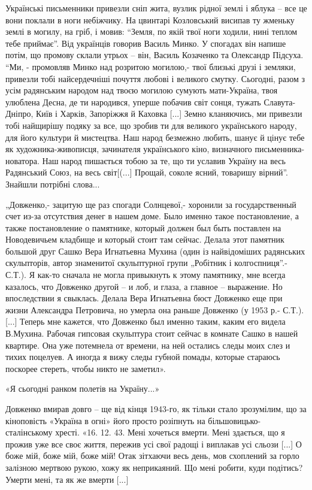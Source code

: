 Українські письменники привезли сніп жита, вузлик рідної землі і яблука –
все це вони поклали в ноги небіжчику. На цвинтарі Козловський висипав ту
жменьку землі в могилу, на гріб, і мовив: \enquote{Земля, по якій твої ноги ходили,
нині теплом тебе приймає}.  Від українців говорив Василь Минко. У спогадах
він напише потім, що промову склали утрьох – він, Василь Козаченко та
Олександр Підсуха. \enquote{Ми, - промовляв Минко над розритою могилою,- твої
близькі друзі і земляки, привезли тобі найсердечніші почуття  любові і
великого смутку. Сьогодні, разом з усім радянським народом над твоєю могилою
сумують мати-Україна, твоя улюблена Десна, де ти народився, уперше побачив
світ сонця, тужать Славута-Дніпро, Київ і Харків, Запоріжжя й Каховка [...]
Земно кланяючись, ми привезли тобі найщирішу подяку за все, що  зробив ти
для великого українського народу, для його культури й мистецтва. Наш народ
безмежно любить, шанує й цінує тебе як художника-живописця, зачинателя
українського кіно, визначного письменника-новатора. Наш народ пишається
тобою за те, що ти уславив Україну на весь Радянський Союз, на весь
світ[(...] Прощай, соколе ясний, товаришу вірний}. Знайшли потрібні слова...

„Довженко,- зацитую ще раз спогади Солнцевої,- хоронили за государственный
счет из-за отсутствия денег в нашем доме. Было именно такое постановление,
а также постановление о памятнике, который должен был быть поставлен на
Новодевичьем кладбище и который стоит там сейчас. Делала этот памятник
большой друг Сашко  Вера Игнатьевна Мухина (один із найвідоміших
радянських скульпторів, автор знаменитої скульптурної групи „Робітник і
колгоспниця”.- С.Т.). Я как-то сначала не могла привыкнуть к этому
памятнику, мне всегда казалось, что Довженко другой – и лоб, и глаза, а
главное – выражение. Но впоследствии я свыклась. Делала Вера Игнатьевна
бюст Довженко еще при жизни Александра Петровича, но умерла она раньше
Довженко (у 1953 р.- С.Т.).[...] Теперь мне кажется, что  Довженко был
именно таким, каким его видела В.Мухина. Рабочая гипсовая скульптура стоит
сейчас в комнате Сашко в нашей квартире. Она уже потемнела от времени, на
ней остались следы моих слез и тихих поцелуев. А иногда я вижу следы
губной помады, которые стараюсь поскорее стереть, чтобы никто не заметил».

«Я сьогодні ранком полетів на Україну...»

Довженко вмирав довго – ще від кінця 1943-го, як тільки стало зрозумілим,
що за кіноповість «Україна в огні» його просто розіпнуть на
більшовицько-сталінському хресті. «16. 12. 43. Мені хочеться вмерти. Мені
здається, що я прожив уже все своє життя, пережив усі свої радощі і
виплакав усі сльози [...] О боже мій, боже мій, боже мій! Отак зітхаючи весь
день, мов схоплений за горло залізною мертвою рукою, хожу як неприкаяний.
Що мені робити, куди подітись? Умерти мені, та як же вмерти [...] 

